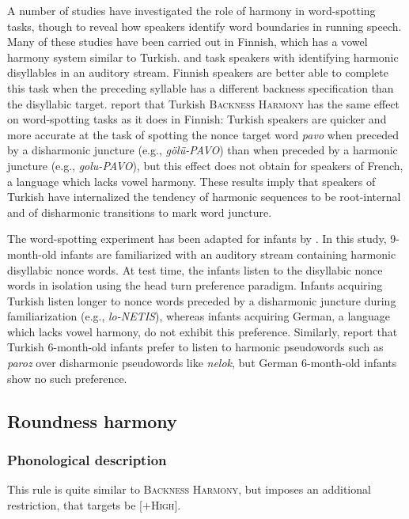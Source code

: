 A number of studies have investigated the role of harmony in word-spotting tasks, though to reveal how speakers identify word boundaries in running speech. Many of these studies have been carried out in Finnish, which has a vowel harmony system similar to Turkish. \citet{Suomi1997} and \citet{Vroomen1998} task speakers with identifying harmonic disyllables in an auditory stream. Finnish speakers are better able to complete this task when the preceding syllable has a different backness specification than the disyllabic target. \citet{Kabak2010} report that Turkish \textsc{Backness Harmony} has the same effect on word-spotting tasks as it does in Finnish: Turkish speakers are quicker and more accurate at the task of spotting the nonce target word \emph{pavo} when preceded by a disharmonic juncture (e.g., \emph{gölü-PAVO}) than when preceded by a harmonic juncture (e.g., \emph{golu-PAVO}), but this effect does not obtain for speakers of French, a language which lacks vowel harmony. These results imply that speakers of Turkish have internalized the tendency of harmonic sequences to be root-internal and of disharmonic transitions to mark word juncture.

The word-spotting experiment has been adapted for infants by \citep{Kampen2008}. In this study, 9-month-old infants are familiarized with an auditory stream containing harmonic disyllabic nonce words. At test time, the infants listen to the disyllabic nonce words in isolation using the head turn preference paradigm. Infants acquiring Turkish listen longer to nonce words preceded by a disharmonic juncture during familiarization (e.g., \emph{lo-NETIS}), whereas infants acquiring German, a language which lacks vowel harmony, do not exhibit this preference. Similarly, \citeauthor{Kampen2008} report that Turkish 6-month-old infants prefer to listen to harmonic pseudowords such as \emph{paroz} over disharmonic pseudowords like \emph{nelok}, but German 6-month-old infants show no such preference. 

\subsection{Roundness harmony}

\subsubsection{Phonological description}

This rule is quite similar to \textsc{Backness Harmony}, but imposes an additional restriction, that targets be [$+$\textsc{High}]. 

